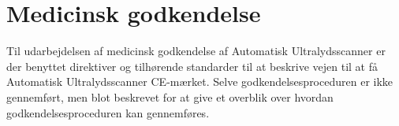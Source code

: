 \section{Medicinsk godkendelse}
Til udarbejdelsen af medicinsk godkendelse af Automatisk Ultralydsscanner er der benyttet direktiver og tilhørende standarder til at beskrive vejen til at få Automatisk Ultralydsscanner CE-mærket. Selve godkendelsesproceduren er ikke gennemført, men blot beskrevet for at give et overblik over hvordan godkendelsesproceduren kan gennemføres. 

